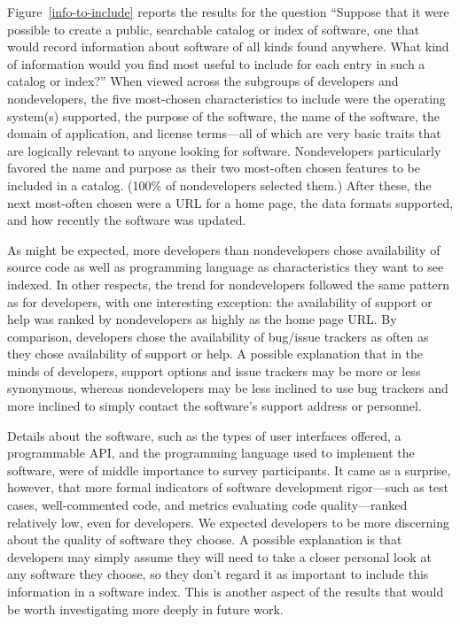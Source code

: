 \documentclass[review]{elsarticle}
\begin{document}
Figure~\ref{info-to-include} reports the results for the question ``Suppose that it were possible to create a public, searchable catalog or index of software, one that would record information about software of all kinds found anywhere.  What kind of information would you find most useful to include for each entry in such a catalog or index?''   When viewed across the subgroups of developers and nondevelopers, the five most-chosen characteristics to include were the operating system(s) supported, the purpose of the software, the name of the software, the domain of application, and license terms---all of which are very basic traits that are logically relevant to anyone looking for software.  Nondevelopers particularly favored the name and purpose as their two most-often chosen features to be included in a catalog.  (100\% of nondevelopers selected them.)  After these, the next most-often chosen were a URL for a home page, the data formats supported, and how recently the software was updated.

As might be expected, more developers than nondevelopers chose availability of source code as well as programming language as characteristics they want to see indexed.  In other respects, the trend for nondevelopers followed the same pattern as for developers, with one interesting exception: the availability of support or help was ranked by nondevelopers as highly as the home page URL.  By comparison, developers chose the availability of bug/issue trackers as often as they chose availability of support or help.  A possible explanation that in the minds of developers, support options and issue trackers may be more or less synonymous, whereas nondevelopers may be less inclined to use bug trackers and more inclined to simply contact the software's support address or personnel.

Details about the software, such as the types of user interfaces offered, a programmable API, and the programming language used to implement the software, were of middle importance to survey participants.  It came as a surprise, however, that more formal indicators of software development rigor---such as test cases, well-commented code, and metrics evaluating code quality---ranked relatively low, even for developers.  We expected developers to be more discerning about the quality of software they choose.  A possible explanation is that developers may simply assume they will need to take a closer personal look at any software they choose, so they don't regard it as important to include this information in a software index.  This is another aspect of the results that would be worth investigating more deeply in future work.
\end{document}

